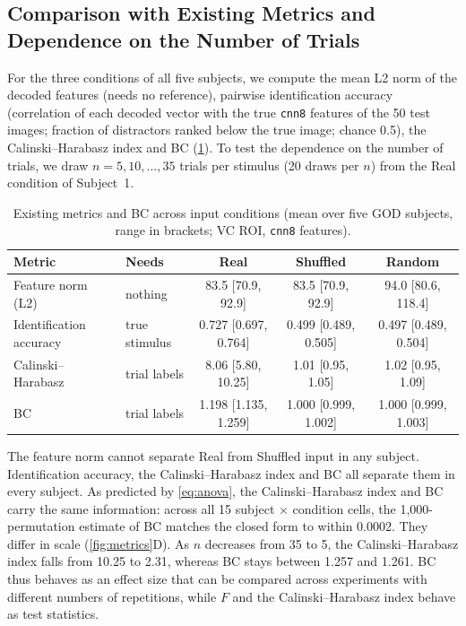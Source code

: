 \documentclass[11pt,a4paper]{article}
\begin{document}
\subsection{Comparison with Existing Metrics and Dependence on the Number of Trials}
\label{sec:god-metrics}

For the three conditions of all five subjects, we compute the mean L2 norm of
the decoded features (needs no reference), pairwise identification accuracy
(correlation of each decoded vector with the true \texttt{cnn8} features of the
50 test images; fraction of distractors ranked below the true image; chance
0.5), the Calinski--Harabasz index and BC (\cref{tab:metrics}). To test the
dependence on the number of trials, we draw $n=5,10,\ldots,35$ trials per
stimulus (20 draws per $n$) from the Real condition of Subject~1.

\begin{table}[htbp]
\centering
\caption{Existing metrics and BC across input conditions (mean over five GOD
  subjects, range in brackets; VC ROI, \texttt{cnn8} features).}
\label{tab:metrics}
\footnotesize
\setlength{\tabcolsep}{4pt}
\begin{tabular}{llccc}
\toprule
Metric & Needs & Real & Shuffled & Random \\
\midrule
Feature norm (L2)       & nothing                & 83.5 [70.9, 92.9]     & 83.5 [70.9, 92.9]     & 94.0 [80.6, 118.4] \\
Identification accuracy & true stimulus          & 0.727 [0.697, 0.764]  & 0.499 [0.489, 0.505]  & 0.497 [0.489, 0.504] \\
Calinski--Harabasz      & trial labels           & 8.06 [5.80, 10.25]    & 1.01 [0.95, 1.05]     & 1.02 [0.95, 1.09] \\
BC                      & trial labels           & 1.198 [1.135, 1.259]  & 1.000 [0.999, 1.002]  & 1.000 [0.999, 1.003] \\
\bottomrule
\end{tabular}
\end{table}

The feature norm cannot separate Real from Shuffled input in any subject.
Identification accuracy, the Calinski--Harabasz index and BC all separate them
in every subject. As predicted by \cref{eq:anova}, the Calinski--Harabasz index
and BC carry the same information: across all 15 subject $\times$ condition
cells, the 1,000-permutation estimate of BC matches the closed form to within
0.0002. They differ in scale (\cref{fig:metrics}D). As $n$ decreases from 35 to
5, the Calinski--Harabasz index falls from 10.25 to 2.31, whereas BC stays
between 1.257 and 1.261. BC thus behaves as an effect size that can be compared
across experiments with different numbers of repetitions, while $F$ and the
Calinski--Harabasz index behave as test statistics.
\end{document}
